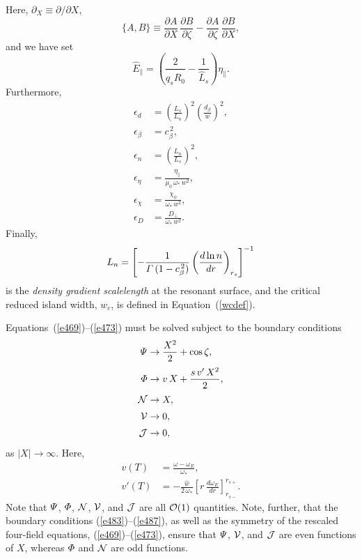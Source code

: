 \documentclass[notitlepage,12pt]{article}
\begin{document}
Here,  $\partial_X\equiv \partial/\partial X$, 
\begin{equation}
\{A,B\} \equiv \frac{\partial A}{\partial X}\,\frac{\partial B}{\partial\zeta} - \frac{\partial A}{\partial \zeta}\,\frac{\partial B}{\partial X},
\end{equation}
and we have set
\begin{equation}
\hat{E}_\parallel = \left(\frac{2}{q_s\hat{R}_0}-\frac{1}{\hat{L}_s}\right)\eta_\parallel.
\end{equation}
Furthermore,
\begin{align}
\epsilon_d &= \left(\frac{L_s}{L_n}\right)^2\left(\frac{d_\beta}{w}\right)^2,\label{e479}\\[0.5ex]
\epsilon_\beta &= c_\beta^{\,2},\label{e480}\\[0.5ex]
\epsilon_n&= \left(\frac{L_n}{L_s}\right)^2,\\[0.5ex]
\epsilon_\eta &= \frac{\eta_\parallel}{\mu_0\,\omega_\ast\,w^2},\label{e481}\\[0.5ex]
\epsilon_\chi &= \frac{\chi_\phi}{\omega_\ast\,w^2},\label{e482}\\[0.5ex]
\epsilon_D &= \frac{D_\perp}{\omega_\ast\,w^2}.
\end{align}
Finally,
\begin{equation}
L_n= \left[-\frac{1}{{\mit\Gamma}\,(1-c_\beta^{\,2})}\left(\frac{d\ln n}{dr}\right)_{r_s}\right]^{-1}
\end{equation}
is the {\em density gradient scalelength}\/  at the resonant surface, 
and the critical reduced island width, $w_c$, is defined in Equation~(\ref{wcdef}). 

Equations~(\ref{e469})--(\ref{e473}) must be solved subject to the boundary conditions
\begin{align}
{\mit\Psi}&\rightarrow \frac{X^{2}}{2} + \cos\zeta,\label{e483}\\[0.5ex]
{\mit\Phi} &\rightarrow v\,X +\frac{ s\,v'\,X^{2}}{2},\label{e484}\\[0.5ex]
{\cal N}&\rightarrow X,\label{e486}\\[0.5ex]
{\cal V}&\rightarrow 0,\label{e486a}\\[0.5ex]
{\cal J}& \rightarrow 0,\label{e487}
\end{align}
as $|X|\rightarrow\infty$.  Here,
\begin{align}
v(T) &= \frac{\omega-\omega_E}{\omega_\ast},\label{e488}\\[0.5ex]
v'(T) &= -\frac{\hat{w}}{2\,\omega_\ast}\left[r\,\frac{d\omega_E}{dr}\right]_{r_{s-}}^{r_{s+}}.\label{e489}
\end{align}
Note that ${\mit\Psi}$, ${\mit\Phi}$, ${\cal N}$, ${\cal V}$, and ${\cal J}$ are all ${\cal O}(1)$ quantities.
Note, further,  that the boundary conditions (\ref{e483})--(\ref{e487}),
as well as the symmetry of the rescaled four-field equations,  (\ref{e469})--(\ref{e473}), ensure that ${\mit\Psi}$, ${\cal V}$, and
${\cal J}$ are even functions of $X$, whereas ${\mit\Phi}$ and ${\cal N}$ are odd functions. 
\end{document}
